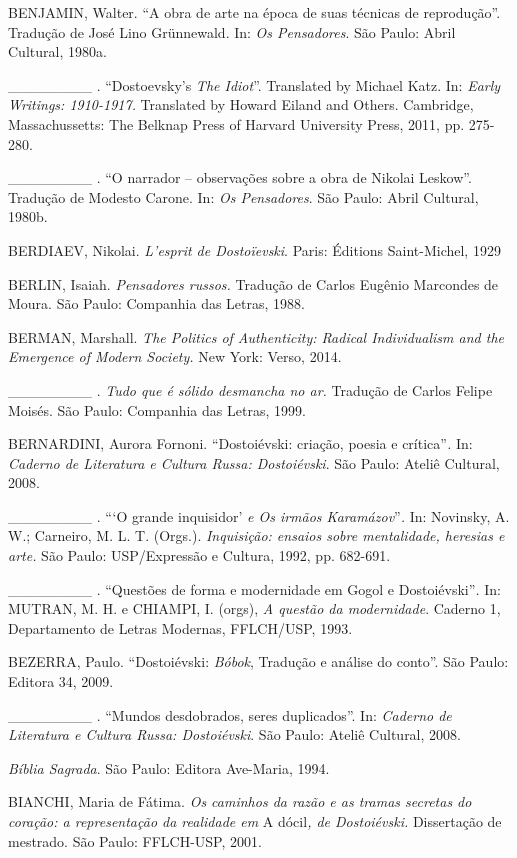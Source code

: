 BENJAMIN, Walter. ``A obra de arte na época de suas técnicas de
reprodução''. Tradução de José Lino Grünnewald. In: \emph{Os
Pensadores}. São Paulo: Abril Cultural, 1980a.

\_\_\_\_\_\_\_\_ . ``Dostoevsky's \emph{The Idiot}''. Translated by
Michael Katz. In: \emph{Early Writings: 1910-1917.} Translated by Howard
Eiland and Others. Cambridge, Massachussetts: The Belknap Press of
Harvard University Press, 2011, pp. 275-280.

\_\_\_\_\_\_\_\_ . ``O narrador -- observações sobre a obra de Nikolai
Leskow''. Tradução de Modesto Carone. In: \emph{Os Pensadores}. São
Paulo: Abril Cultural, 1980b.

BERDIAEV, Nikolai. \emph{L'esprit de Dostoïevski}. Paris: Éditions
Saint-Michel, 1929

BERLIN, Isaiah. \emph{Pensadores russos.} Tradução de Carlos Eugênio
Marcondes de Moura. São Paulo: Companhia das Letras, 1988.

BERMAN, Marshall. \emph{The Politics of Authenticity: Radical
Individualism and the Emergence of Modern Society.} New York: Verso,
2014.

\_\_\_\_\_\_\_\_ . \emph{Tudo que é sólido desmancha no ar.} Tradução de
Carlos Felipe Moisés. São Paulo: Companhia das Letras, 1999.

BERNARDINI, Aurora Fornoni. ``Dostoiévski: criação, poesia e
crítica''\emph{.} In: \emph{Caderno de Literatura e Cultura Russa:
Dostoiévski}. São Paulo: Ateliê Cultural, 2008.

\_\_\_\_\_\_\_\_ . ```O grande inquisidor' \emph{e Os irmãos
Karamázov}''\emph{.} In: Novinsky, A. W.; Carneiro, M. L. T. (Orgs.).
\emph{Inquisição: ensaios sobre mentalidade, heresias e arte.} São
Paulo: USP/Expressão e Cultura, 1992, pp. 682-691.

\_\_\_\_\_\_\_\_ . ``Questões de forma e modernidade em Gogol e
Dostoiévski''\emph{.} In: MUTRAN, M. H. e CHIAMPI, I. (orgs), \emph{A
questão da modernidade}. Caderno 1, Departamento de Letras Modernas,
FFLCH/USP, 1993.

BEZERRA, Paulo. ``Dostoiévski: \emph{Bóbok}, Tradução e análise do
conto''. São Paulo: Editora 34, 2009.

\_\_\_\_\_\_\_\_ . ``Mundos desdobrados, seres duplicados''. In:
\emph{Caderno de Literatura e Cultura Russa: Dostoiévski}. São Paulo:
Ateliê Cultural, 2008.

\emph{Bíblia Sagrada}. São Paulo: Editora Ave-Maria, 1994.

BIANCHI, Maria de Fátima. \emph{Os caminhos da razão e as tramas
secretas do coração: a representação da realidade em} A dócil\emph{, de
Dostoiévski.} Dissertação de mestrado. São Paulo: FFLCH-USP, 2001.

